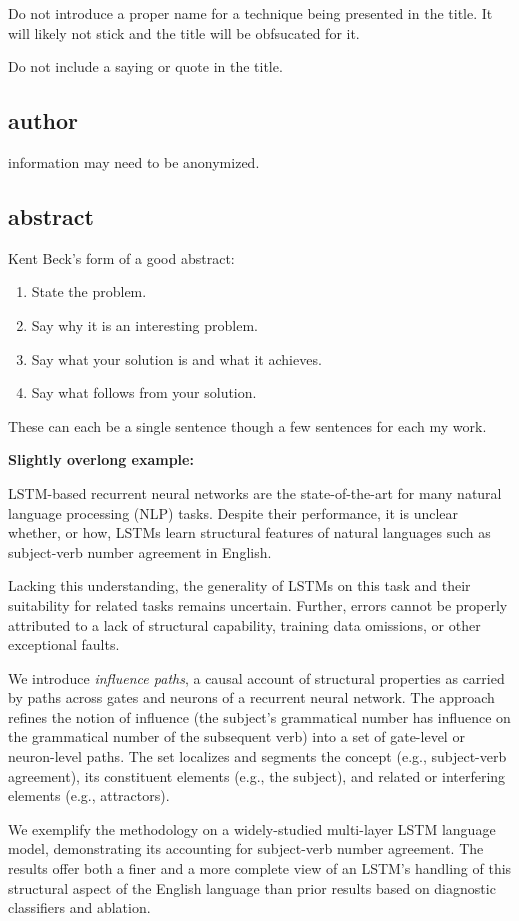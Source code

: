   Do not introduce a proper name for a technique being presented in the title. It will likely not
  stick and the title will be obfsucated for it.

  Do not include a saying or quote in the title.

\subsection{author} information may need to be anonymized.

\subsection{abstract}

Kent Beck's form of a good abstract:

  \begin{enumerate}
  \item{} State the problem.
  \item{} Say why it is an interesting problem.
  \item{} Say what your solution is and what it achieves.
  \item{} Say what follows from your solution.
  \end{enumerate}
  These can each be a single sentence though a few sentences for each my work.

  \textbf{Slightly overlong example:}

  {\small

 LSTM-based recurrent neural networks are the state-of-the-art for many
natural language processing (NLP) tasks. Despite their performance, it is unclear whether, or how,
LSTMs learn structural features of natural languages such as subject-verb number agreement in
English.

 Lacking this understanding, the generality of LSTMs
on this task and their suitability for related tasks remains uncertain. Further, errors cannot be
properly attributed to a lack of structural capability, training data omissions, or other
exceptional faults.

 We introduce \emph{influence paths}, a causal account of
structural properties as carried by paths across gates and neurons of a recurrent neural network.
The approach refines the notion of influence (the subject's grammatical number has influence on the
grammatical number of the subsequent verb) into a set of gate-level or neuron-level paths. The set
localizes and segments the concept (e.g., subject-verb agreement), its constituent elements (e.g.,
the subject), and related or interfering elements (e.g., attractors).

 We exemplify the methodology on a widely-studied
multi-layer LSTM language model, demonstrating its accounting for subject-verb number agreement.
The results offer both a finer and a more complete view of an LSTM's handling of this structural
aspect of the English language than prior results based on diagnostic classifiers and ablation.

  }

